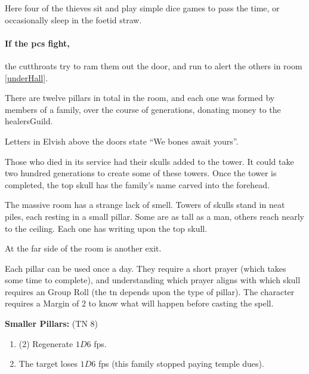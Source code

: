 
Here four of the thieves sit and play simple dice games to pass the time, or occasionally sleep in the foetid straw.

\paragraph{If the \glspl{pc} fight,}
the cutthroats try to ram them out the door, and run to alert the others in room \ref{underHall}.



There are twelve pillars in total in the room, and each one was formed by members of a family, over the course of generations, donating money to the \gls{healersGuild}.

\begin{boxtext}
  Letters in Elvish above the doors state ``We bones await yours''.
\end{boxtext}

Those who died in its service had their skulls added to the tower.
It could take two hundred generations to create some of these towers.
Once the tower is completed, the top skull has the family's name carved into the forehead.

\begin{boxtext}

  The massive room has a strange lack of smell.  Towers of skulls stand in neat piles, each resting in a small pillar.  Some are as tall as a man, others reach nearly to the ceiling.  Each one has writing upon the top skull.

  At the far side of the room is another exit.

\end{boxtext}

Each pillar can be used once a day.
They require a short prayer (which takes some time to complete), and understanding which prayer aligns with which skull requires an  Group Roll (the \gls{tn} depends upon the type of pillar).
The character requires a Margin of 2 to know what will happen before casting the spell.%

\textbf{Smaller Pillars:} (TN 8)

\begin{enumerate}
  \item{(2) Regenerate $1D6$ \glspl{fp}.}
  \item{The target loses $1D6$ \glspl{fp} (this family stopped paying temple dues).}
\end{enumerate}

